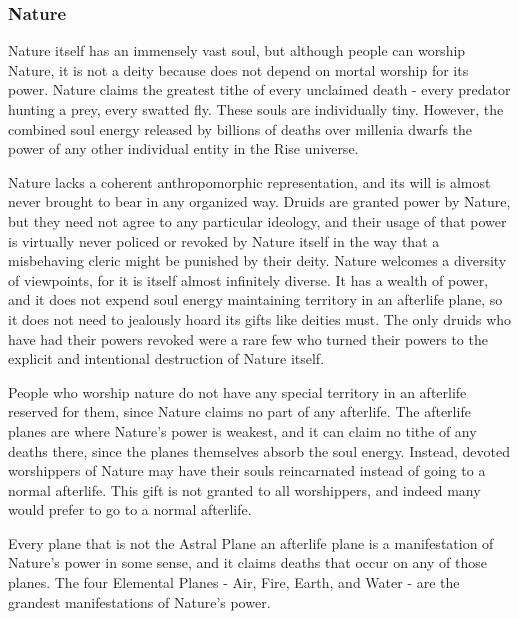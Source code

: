         \subsubsection{Nature}
            Nature itself has an immensely vast soul, but although people can worship Nature, it is not a deity because does not depend on mortal worship for its power.
            Nature claims the greatest tithe of every unclaimed death - every predator hunting a prey, every swatted fly.
            These souls are individually tiny.
            However, the combined soul energy released by billions of deaths over millenia dwarfs the power of any other individual entity in the Rise universe.

            Nature lacks a coherent anthropomorphic representation, and its will is almost never brought to bear in any organized way.
            Druids are granted power by Nature, but they need not agree to any particular ideology, and their usage of that power is virtually never policed or revoked by Nature itself in the way that a misbehaving cleric might be punished by their deity.
            Nature welcomes a diversity of viewpoints, for it is itself almost infinitely diverse.
            It has a wealth of power, and it does not expend soul energy maintaining territory in an afterlife plane, so it does not need to jealously hoard its gifts like deities must.
            The only druids who have had their powers revoked were a rare few who turned their powers to the explicit and intentional destruction of Nature itself.

            People who worship nature do not have any special territory in an afterlife reserved for them, since Nature claims no part of any afterlife.
            The afterlife planes are where Nature's power is weakest, and it can claim no tithe of any deaths there, since the planes themselves absorb the soul energy.
            Instead, devoted worshippers of Nature may have their souls reincarnated instead of going to a normal afterlife.
            This gift is not granted to all worshippers, and indeed many would prefer to go to a normal afterlife.

            Every plane that is not the Astral Plane an afterlife plane is a manifestation of Nature's power in some sense, and it claims deaths that occur on any of those planes.
            The four Elemental Planes - Air, Fire, Earth, and Water - are the grandest manifestations of Nature's power.

